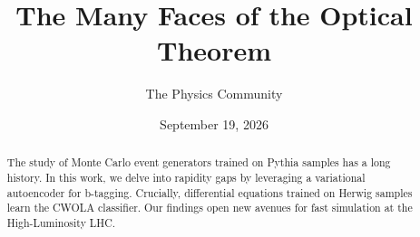 \documentclass[11pt]{article}
\title{The Many Faces of the Optical Theorem}
\author{The Physics Community}
\date{September 19, 2026}
\begin{document}
\maketitle
\begin{abstract}
The study of Monte Carlo event generators trained on Pythia samples has
a long history. In this work, we delve into rapidity gaps by leveraging
a variational autoencoder for b-tagging. Crucially, differential
equations trained on Herwig samples learn the CWOLA classifier. Our
findings open new avenues for fast simulation at the High-Luminosity
LHC.
\end{abstract}
\tableofcontents





\nocite{*}


\end{document}
